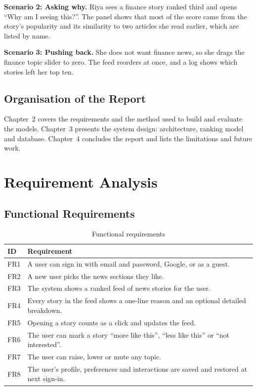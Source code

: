 \documentclass[12pt,a4paper,oneside]{report}
\begin{document}
\textbf{Scenario 2: Asking why.} Riya sees a finance story ranked third and opens ``Why am I seeing
this?''. The panel shows that most of the score came from the story's popularity and its similarity to two
articles she read earlier, which are listed by name.

\textbf{Scenario 3: Pushing back.} She does not want finance news, so she drags the finance topic slider
to zero. The feed reorders at once, and a log shows which stories left her top ten.

\section{Organisation of the Report}
Chapter~2 covers the requirements and the method used to build and evaluate the models. Chapter~3
presents the system design: architecture, ranking model and database. Chapter~4 concludes the report and
lists the limitations and future work.

\chapter{Requirement Analysis}

\section{Functional Requirements}
\begin{table}[H]
\centering
\caption{Functional requirements}
\begin{tabularx}{\textwidth}{lL}
\toprule
ID & Requirement \\
\midrule
FR1 & A user can sign in with email and password, Google, or as a guest. \\
FR2 & A new user picks the news sections they like. \\
FR3 & The system shows a ranked feed of news stories for the user. \\
FR4 & Every story in the feed shows a one-line reason and an optional detailed breakdown. \\
FR5 & Opening a story counts as a click and updates the feed. \\
FR6 & The user can mark a story ``more like this'', ``less like this'' or ``not interested''. \\
FR7 & The user can raise, lower or mute any topic. \\
FR8 & The user's profile, preferences and interactions are saved and restored at next sign-in. \\
\bottomrule
\end{tabularx}
\end{table}
\end{document}
